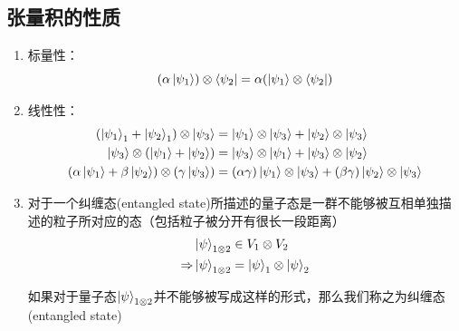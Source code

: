 \documentclass{article}
\begin{document}
\subsection{张量积的性质}
\begin{enumerate}
    \item 标量性：\[(\alpha\ket{\psi_1})\otimes\bra{\psi_2}=\alpha(\ket{\psi_1}\otimes\bra{\psi_2})\]
    \item 线性性：
    \begin{align*}
        (\ket{\psi_1}_1+\ket{\psi_2}_1)\otimes \ket{\psi_3}&=\ket{\psi_1}\otimes\ket{\psi_3}+\ket{\psi_2}\otimes\ket{\psi_3}\\
        \ket{\psi_3}\otimes(\ket{\psi_1}+\ket{\psi_2})&=\ket{\psi_3}\otimes\ket{\psi_1}+\ket{\psi_3}\otimes\ket{\psi_2}\\
        (\alpha\ket{\psi_1}+\beta\ket{\psi_2})\otimes (\gamma\ket{\psi_3})&=(\alpha\gamma)\ket{\psi_1}\otimes\ket{\psi_3}+(\beta\gamma)\ket{\psi_2}\otimes\ket{\psi_3}
    \end{align*}
    \item 对于一个纠缠态(entangled state)所描述的量子态是一群不能够被互相单独描述的粒子所对应的态（包括粒子被分开有很长一段距离）
    \begin{align*}
        &\ket{\psi}_{1\otimes 2}\in V_1\otimes V_2\\
        \Rightarrow& \ket{\psi}_{1\otimes 2}=\ket{\psi}_1\otimes\ket{\psi}_2 
    \end{align*}

    如果对于量子态$\ket{\psi}_{1\otimes 2}$并不能够被写成这样的形式，那么我们称之为纠缠态(entangled state)


\end{enumerate}
\end{document}
